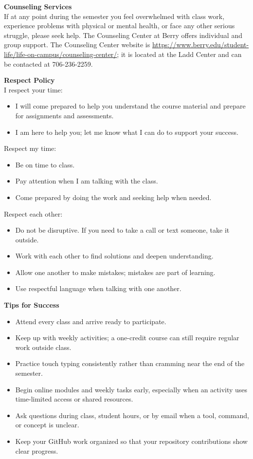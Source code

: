\documentclass[11pt,letterpaper]{article}
\newcommand{\lefthead}[2]{\noindent\textbf{#1}\hfill\\[#2]}
\newcommand{\blankline}{\par\vspace{0.3cm}}
\begin{document}
\lefthead{Counseling Services}{0.3cm}
If at any point during the semester you feel overwhelmed with class work, experience problems with physical or mental health, or face any other serious struggle, please seek help. The Counseling Center at Berry offers individual and group support. The Counseling Center website is \url{https://www.berry.edu/student-life/life-on-campus/counseling-center/}; it is located at the Ladd Center and can be contacted at 706-236-2259.
\blankline

\lefthead{Respect Policy}{0.3cm}
\noindent I respect your time:
\begin{itemize}
    \item I will come prepared to help you understand the course material and prepare for assignments and assessments.
    \item I am here to help you; let me know what I can do to support your success.
\end{itemize}

\noindent Respect my time:
\begin{itemize}
    \item Be on time to class.
    \item Pay attention when I am talking with the class.
    \item Come prepared by doing the work and seeking help when needed.
\end{itemize}

\noindent Respect each other:
\begin{itemize}
    \item Do not be disruptive. If you need to take a call or text someone, take it outside.
    \item Work with each other to find solutions and deepen understanding.
    \item Allow one another to make mistakes; mistakes are part of learning.
    \item Use respectful language when talking with one another.
\end{itemize}

\lefthead{Tips for Success}{0.3cm}
\begin{itemize}
    \item Attend every class and arrive ready to participate.
    \item Keep up with weekly activities; a one-credit course can still require regular work outside class.
    \item Practice touch typing consistently rather than cramming near the end of the semester.
    \item Begin online modules and weekly tasks early, especially when an activity uses time-limited access or shared resources.
    \item Ask questions during class, student hours, or by email when a tool, command, or concept is unclear.
    \item Keep your GitHub work organized so that your repository contributions show clear progress.
\end{itemize}
\end{document}
